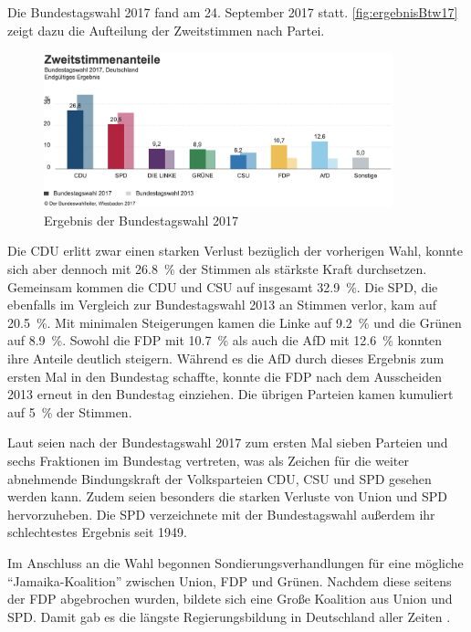 Die Bundestagswahl \num{2017} fand am \num{24}. September \num{2017} statt. \autoref{fig:ergebnisBtw17} zeigt dazu die Aufteilung der Zweitstimmen nach Partei.

\begin{figure}[H]
  \centering
  \includegraphics[width=0.9\textwidth]{data/images/ergebnisBtw17.png}
  \caption{Ergebnis der Bundestagswahl \num{2017} \autocite{noauthor_bundestagswahl_nodate}} \label{fig:ergebnisBtw17}
\end{figure}

Die \ac{CDU} erlitt zwar einen starken Verlust bezüglich der vorherigen Wahl, konnte sich aber dennoch mit \SI{26.8}{\percent} der Stimmen als stärkste Kraft durchsetzen. Gemeinsam kommen die \ac{CDU} und \acs{CSU} auf insgesamt \SI{32.9}{\percent}. Die \ac{SPD}, die ebenfalls im Vergleich zur Bundestagswahl \num{2013} an Stimmen verlor, kam auf \SI{20.5}{\percent}. Mit minimalen Steigerungen kamen die Linke auf \SI{9.2}{\percent} und die Grünen auf \SI{8.9}{\percent}. Sowohl die \ac{FDP} mit \SI{10.7}{\percent} als auch die \ac{AfD} mit \SI{12.6}{\percent} konnten ihre Anteile deutlich steigern. Während es die \ac{AfD} durch dieses Ergebnis zum ersten Mal in den Bundestag schaffte, konnte die \ac{FDP} nach dem Ausscheiden \num{2013} erneut in den Bundestag einziehen. Die übrigen Parteien kamen kumuliert auf \SI{5}{\percent} der Stimmen.

Laut \textcite{schmid_deutscher_2021} seien nach der Bundestagswahl \num{2017} zum ersten Mal sieben Parteien und sechs Fraktionen im Bundestag vertreten, was als Zeichen für die weiter abnehmende Bindungskraft der Volksparteien \ac{CDU}, \ac{CSU} und \ac{SPD} gesehen werden kann. Zudem seien besonders die starken Verluste von Union und \ac{SPD} hervorzuheben. Die \ac{SPD} verzeichnete mit der Bundestagswahl außerdem ihr schlechtestes Ergebnis seit \num{1949}.

Im Anschluss an die Wahl begonnen Sondierungsverhandlungen für eine mögliche \enquote{Jamaika-Koalition} zwischen Union, \ac{FDP} und Grünen. Nachdem diese seitens der \ac{FDP} abgebrochen wurden, bildete sich eine Große Koalition aus Union und \ac{SPD}. Damit gab es die längste Regierungsbildung in Deutschland aller Zeiten \parencite{schmid_deutscher_2021}.

